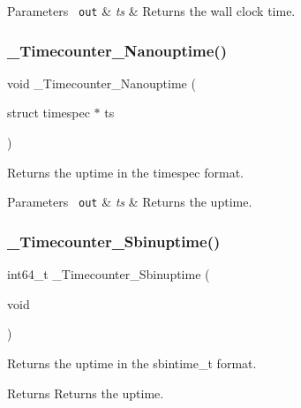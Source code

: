 \begin{DoxyParams}[1]{Parameters}
\mbox{\texttt{ out}}  & {\em ts} & Returns the wall clock time. \\
\hline
\end{DoxyParams}
\mbox{\label{group__RTEMSScoreTimecounter_ga69193b209ce281570491732c00be6cb9}} 
\subsubsection{\texorpdfstring{\_Timecounter\_Nanouptime()}{\_Timecounter\_Nanouptime()}}
{\footnotesize\ttfamily void \+\_\+\+Timecounter\+\_\+\+Nanouptime (\begin{DoxyParamCaption}\item[{struct timespec $\ast$}]{ts }\end{DoxyParamCaption})}



Returns the uptime in the timespec format. 


\begin{DoxyParams}[1]{Parameters}
\mbox{\texttt{ out}}  & {\em ts} & Returns the uptime. \\
\hline
\end{DoxyParams}
\mbox{\label{group__RTEMSScoreTimecounter_ga2fa28f3700d306d5ba38343f2c8d1867}} 
\subsubsection{\texorpdfstring{\_Timecounter\_Sbinuptime()}{\_Timecounter\_Sbinuptime()}}
{\footnotesize\ttfamily int64\+\_\+t \+\_\+\+Timecounter\+\_\+\+Sbinuptime (\begin{DoxyParamCaption}\item[{void}]{ }\end{DoxyParamCaption})}



Returns the uptime in the sbintime\+\_\+t format. 

\begin{DoxyReturn}{Returns}
Returns the uptime. 
\end{DoxyReturn}
\mbox{\label{group__RTEMSScoreTimecounter_gaf945e2324ee8b00d80b8e22a199c5a3c}} 
